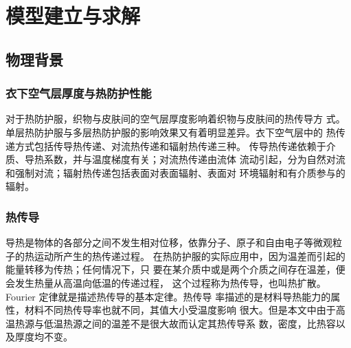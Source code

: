 \documentclass{article}
\begin{document}
	\section{模型建立与求解}
	\subsection{物理背景}
	\subsubsection{衣下空气层厚度与热防护性能}
	对于热防护服，织物与皮肤间的空气层厚度影响着织物与皮肤间的热传导方
	式。单层热防护服与多层热防护服的影响效果又有着明显差异。衣下空气层中的
	热传递方式包括传导热传递、对流热传递和辐射热传递三种。
	传导热传递依赖于介质、导热系数，并与温度梯度有关；对流热传递由流体
	流动引起，分为自然对流和强制对流；辐射热传递包括表面对表面辐射、表面对
	环境辐射和有介质参与的辐射。
	\subsubsection{热传导}
	导热是物体的各部分之间不发生相对位移，依靠分子、原子和自由电子等微观粒
	子的热运动所产生的热传递过程。
	在热防护服的实际应用中，因为温差而引起的能量转移为传热；任何情况下，只
	要在某介质中或是两个介质之间存在温差，便会发生热量从高温向低温的传递过程，
	这个过程称为热传导，也叫热扩散。Fourier 定律就是描述热传导的基本定律。热传导
	率描述的是材料导热能力的属性，材料不同热传导率也就不同，其值大小受温度影响
	很大。但是本文中由于高温热源与低温热源之间的温差不是很大故而认定其热传导系
	数，密度，比热容以及厚度均不变。
\end{document}
